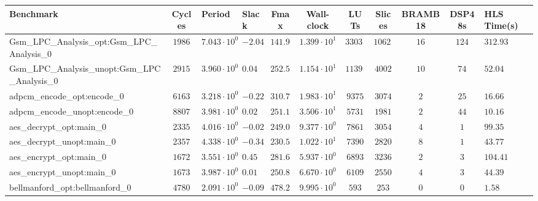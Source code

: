 \begin{tabular}{|l|c|HHc|c|c|c|c|cH|}
\hline
Benchmark                                       & Cycles       & Period                 & Slack     & Fmax       & Wall-clock              & LUTs       & Slices    & BRAMB18 & DSP48s  & HLS Time(s) \\
\hline
Gsm\_LPC\_Analysis\_opt:Gsm\_LPC\_Analysis\_0   & $ 1986     $ & $ 7.043 \cdot 10^{0} $ & $ -2.04 $ & $ 141.98 $ & $ 1.399 \cdot 10^{1}  $ & $ 33032  $ & $ 10627 $ & $ 16  $ & $ 124 $ & $ 312.93  $ \\
Gsm\_LPC\_Analysis\_unopt:Gsm\_LPC\_Analysis\_0 & $ 2915     $ & $ 3.960 \cdot 10^{0} $ & $ 0.04  $ & $ 252.53 $ & $ 1.154 \cdot 10^{1}  $ & $ 11398  $ & $ 4002  $ & $ 10  $ & $ 74  $ & $ 52.04   $ \\
adpcm\_encode\_opt:encode\_0                    & $ 6163     $ & $ 3.218 \cdot 10^{0} $ & $ -0.22 $ & $ 310.75 $ & $ 1.983 \cdot 10^{1}  $ & $ 9375   $ & $ 3074  $ & $ 2   $ & $ 25  $ & $ 16.66   $ \\
adpcm\_encode\_unopt:encode\_0                  & $ 8807     $ & $ 3.981 \cdot 10^{0} $ & $ 0.02  $ & $ 251.19 $ & $ 3.506 \cdot 10^{1}  $ & $ 5731   $ & $ 1981  $ & $ 2   $ & $ 44  $ & $ 10.16   $ \\
aes\_decrypt\_opt:main\_0                       & $ 2335     $ & $ 4.016 \cdot 10^{0} $ & $ -0.02 $ & $ 249.00 $ & $ 9.377 \cdot 10^{0}  $ & $ 7861   $ & $ 3054  $ & $ 4   $ & $ 1   $ & $ 99.35   $ \\
aes\_decrypt\_unopt:main\_0                     & $ 2357     $ & $ 4.338 \cdot 10^{0} $ & $ -0.34 $ & $ 230.52 $ & $ 1.022 \cdot 10^{1}  $ & $ 7390   $ & $ 2820  $ & $ 8   $ & $ 1   $ & $ 43.77   $ \\
aes\_encrypt\_opt:main\_0                       & $ 1672     $ & $ 3.551 \cdot 10^{0} $ & $ 0.45  $ & $ 281.61 $ & $ 5.937 \cdot 10^{0}  $ & $ 6893   $ & $ 3236  $ & $ 2   $ & $ 3   $ & $ 104.41  $ \\
aes\_encrypt\_unopt:main\_0                     & $ 1673     $ & $ 3.987 \cdot 10^{0} $ & $ 0.01  $ & $ 250.82 $ & $ 6.670 \cdot 10^{0}  $ & $ 6109   $ & $ 2550  $ & $ 4   $ & $ 3   $ & $ 44.39   $ \\
bellmanford\_opt:bellmanford\_0                 & $ 4780     $ & $ 2.091 \cdot 10^{0} $ & $ -0.09 $ & $ 478.24 $ & $ 9.995 \cdot 10^{0}  $ & $ 593    $ & $ 253   $ & $ 0   $ & $ 0   $ & $ 1.58    $ \\

\end{tabular}
